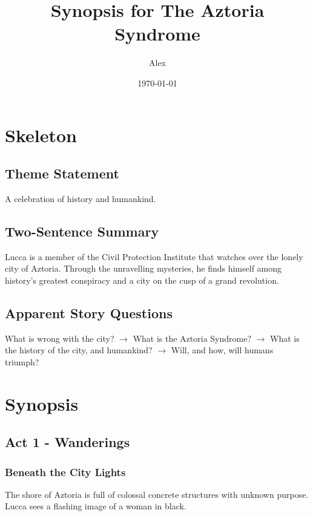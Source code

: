 \documentclass[11pt]{article}
\begin{document}
\begin{titlepage}
\title{Synopsis for The Aztoria Syndrome}
\author{Alex}
\date{\today} %
\maketitle
\thispagestyle{empty} %
\end{titlepage}

\newpage %







\section{Skeleton}
	\subsection{Theme Statement}
	A celebration of history and humankind.
	\subsection{Two-Sentence Summary}
	Lucca is a member of the Civil Protection Institute that watches over the lonely city of Aztoria. Through the unravelling mysteries, he finds himself among history's greatest conspiracy and a city on the cusp of a grand revolution.
	\subsection{Apparent Story Questions}
	What is wrong with the city? $\rightarrow$ 
	What is the Aztoria Syndrome? $\rightarrow$  
	What is the history of the city, and humankind? $\rightarrow$ 
	Will, and how, will humans triumph?
\newpage




\section{Synopsis}
	\subsection{Act 1 - Wanderings}
		\subsubsection{Beneath the City Lights}
		The shore of Aztoria is full of colossal concrete structures with unknown purpose. 
		Lucca sees a flashing image of a woman in black. 
		
\end{document}
